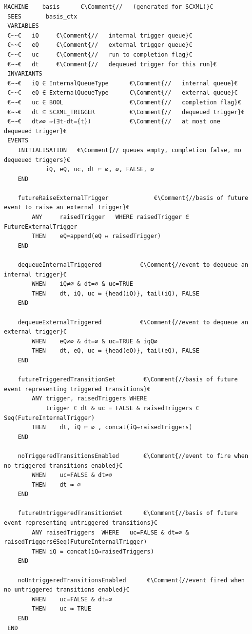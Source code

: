  \begin{lstfloat}[!tb]
 \begin{lstlisting}[caption={Abstract basis machine}, label={lst:BasisMachine},language=Event-B, escapechar=€, frame=single, basicstyle=\rmfamily\scriptsize, belowskip=-2.0 \baselineskip]
 MACHINE	basis	   €\Comment{//   (generated for SCXML)}€
 SEES    	basis_ctx
 VARIABLES
 €~~€	iQ	   €\Comment{//   internal trigger queue}€
 €~~€	eQ	   €\Comment{//   external trigger queue}€
 €~~€	uc	   €\Comment{//   run to completion flag}€
 €~~€	dt	   €\Comment{//   dequeued trigger for this run}€
 INVARIANTS
 €~~€	iQ ∈ InternalQueueType	   	€\Comment{//   internal queue}€
 €~~€	eQ ∈ ExternalQueueType	   	€\Comment{//   external queue}€
 €~~€	uc ∈ BOOL	   				€\Comment{//   completion flag}€
 €~~€	dt ⊆ SCXML_TRIGGER	   		€\Comment{//   dequeued trigger}€
 €~~€	dt≠∅ ⇒(∃t·dt={t})			€\Comment{//   at most one dequeued trigger}€
 EVENTS
 	INITIALISATION   €\Comment{// queues empty, completion false, no dequeued triggers}€
 			iQ, eQ, uc, dt ≔ ∅,	∅, FALSE, ∅  
 	END

 	futureRaiseExternalTrigger      	   €\Comment{//basis of future event to raise an external trigger}€
 		ANY 	raisedTrigger	WHERE raisedTrigger ∈ FutureExternalTrigger
 		THEN	eQ≔append(eQ ↦ raisedTrigger)
 	END

 	dequeueInternalTriggered      	   €\Comment{//event to dequeue an internal trigger}€ 
 		WHEN	iQ≠∅ & dt=∅ & uc=TRUE 
 		THEN	dt, iQ, uc ≔ {head(iQ)}, tail(iQ), FALSE
 	END

 	dequeueExternalTriggered      	   €\Comment{//event to dequeue an external trigger}€ 
 		WHEN	eQ≠∅ & dt=∅ & uc=TRUE & iqQ∅
		THEN	dt, eQ, uc ≔ {head(eQ)}, tail(eQ), FALSE
 	END

 	futureTriggeredTransitionSet      	€\Comment{//basis of future event representing triggered transitions}€
 		ANY trigger, raisedTriggers WHERE
 		 	trigger ∈ dt & uc = FALSE & raisedTriggers ∈ Seq(FutureInternalTrigger)
 		THEN	dt, iQ ≔ ∅ , concat(iQ↦raisedTriggers)
 	END

 	noTriggeredTransitionsEnabled      	€\Comment{//event to fire when no triggered transitions enabled}€ 
 		WHEN 	uc=FALSE & dt≠∅
 		THEN	dt ≔ ∅
 	END

 	futureUntriggeredTransitionSet      €\Comment{//basis of future event representing untriggered transitions}€
 		ANY	raisedTriggers	WHERE	uc=FALSE & dt=∅ & raisedTriggers∈Seq(FutureInternalTrigger)
 		THEN iQ ≔ concat(iQ↦raisedTriggers)
 	END

 	noUntriggeredTransitionsEnabled      €\Comment{//event fired when no untriggered transitions enabled}€
 		WHEN	uc=FALSE & dt=∅
 		THEN	uc ≔ TRUE
 	END
 END
 \end{lstlisting}
 \end{lstfloat}

